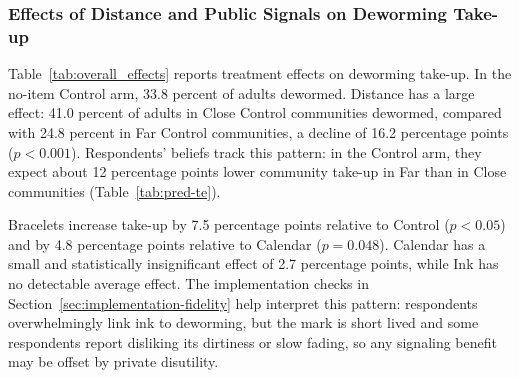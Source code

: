 \documentclass[ECM\space ReStud.tex]{subfiles}
\begin{document}
\begin{table}[ht!]
\scriptsize
\caption{Effects of Item/Signal Arms and Distance on the Observability of Deworming}
\label{tab:beliefs-visibility}
\centering
\begin{threeparttable}
\resizebox{\textwidth}{!}{%

}
\end{threeparttable}
\end{table}


\subsubsection{Effects of Distance and Public Signals on Deworming Take-up}

Table~\ref{tab:overall_effects} reports treatment effects on deworming take-up. In the no-item Control arm, 33.8 percent of adults dewormed. Distance has a large effect: 41.0 percent of adults in Close Control communities dewormed, compared with 24.8 percent in Far Control communities, a decline of 16.2 percentage points (\(p<0.001\)). Respondents' beliefs track this pattern: in the Control arm, they expect about 12 percentage points lower community take-up in Far than in Close communities (Table~\ref{tab:pred-te}).

Bracelets increase take-up by 7.5 percentage points relative to Control (\(p<0.05\)) and by 4.8 percentage points relative to Calendar (\(p=0.048\)). Calendar has a small and statistically insignificant effect of 2.7 percentage points, while Ink has no detectable average effect. The implementation checks in Section~\ref{sec:implementation-fidelity} help interpret this pattern: respondents overwhelmingly link ink to deworming, but the mark is short lived and some respondents report disliking its dirtiness or slow fading, so any signaling benefit may be offset by private disutility.
\end{document}
